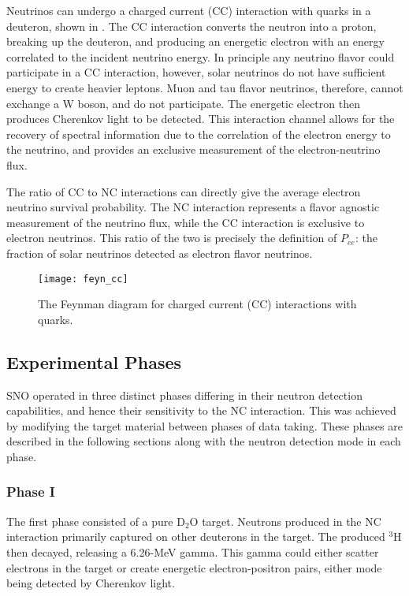 Neutrinos can undergo a charged current (CC) interaction with quarks in a deuteron, shown in .
The CC interaction converts the neutron into a proton, breaking up the deuteron, and producing an energetic electron with an energy correlated to the incident neutrino energy.
In principle any neutrino flavor could participate in a CC interaction, however, solar neutrinos do not have sufficient energy to create heavier leptons.
Muon and tau flavor neutrinos, therefore, cannot exchange a W boson, and do not participate.
The energetic electron then produces Cherenkov light to be detected.
This interaction channel allows for the recovery of spectral information due to the correlation of the electron energy to the neutrino, and provides an exclusive measurement of the electron-neutrino flux. 


The ratio of CC to NC interactions can directly give the average electron neutrino survival probability.
The NC interaction represents a flavor agnostic measurement of the neutrino flux, while the CC interaction is exclusive to electron neutrinos.
This ratio of the two is precisely the definition of $P_{ee}$: the fraction of solar neutrinos detected as electron flavor neutrinos.

\begin{figure}
\centering
\texttt{[image: feyn\_cc]}
\caption{\label{fig:CC}The Feynman diagram for charged current (CC) interactions with quarks.}
\end{figure}

\subsection{Experimental Phases}

SNO operated in three distinct phases differing in their neutron detection capabilities, and hence their sensitivity to the NC interaction.
This was achieved by modifying the target material between phases of data taking.
These phases are described in the following sections along with the neutron detection mode in each phase.

\subsubsection{Phase I}

The first phase consisted of a pure D$_2$O target. 
Neutrons produced in the NC interaction primarily captured on other deuterons in the target.
The produced $^3$H then decayed, releasing a 6.26-MeV gamma.
This gamma could either scatter electrons in the target or create energetic electron-positron pairs, either mode being detected by Cherenkov light.


